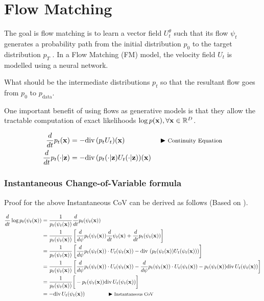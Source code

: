 \documentclass[a4paper, 11pt]{article}
\begin{document}
\section{Flow Matching}
The goal is flow matching is to learn a vector field $U_t^{\theta}$ such that its flow $\psi_t$ generates a probability path from the initial distribution $p_0$ to the target distribution $p_T$ \citep{lipman2024flow}. In a Flow Matching (FM) model, the velocity field $U_t$ is modelled using a neural network.

What should be the intermediate distributions $p_t$ so that the resultant flow goes from $p_0$ to $p_{\text{data}}$.

\begin{Takeaway}{}{}
    One important benefit of using flows as generative models is that they allow the tractable computation of exact likelihoods $\log p(\mbox{$\mbox{$\mathbf{x}$}$}), \forall \mbox{$\mbox{$\mathbf{x}$}$} \in \mathbb{R}^D$.
\end{Takeaway}


\begin{align}
    \frac{d}{dt} p_t(\mbox{$\mbox{$\mathbf{x}$}$}) &= - \text{div}\, (p_t U_t)(\mbox{$\mbox{$\mathbf{x}$}$}) && \blacktriangleright\text{\footnotesize Continuity Equation} \label{eq:contin-eq}\\ 
    \frac{d}{dt} p_t(\cdot | \mbox{$\mbox{$\mathbf{z}$}$}) &= - \text{div}\, (p_t(\cdot |\mbox{$\mbox{$\mathbf{z}$}$}) U_t(\cdot |\mbox{$\mbox{$\mathbf{z}$}$}))(\mbox{$\mbox{$\mathbf{x}$}$})
\end{align}
 

\subsubsection{Instantaneous Change-of-Variable formula}

Proof for the above Instantaneous CoV can be derived as follows (Based on \cite{mathieu2020riemannian}).

\begin{align}
    \frac{d}{dt} \log p_t(\psi_t(\mbox{$\mbox{$\mathbf{x}$}$})) &=  \frac{1}{p_t(\psi_t(\mbox{$\mbox{$\mathbf{x}$}$}))}\frac{d}{dt}p_t(\psi_t(\mbox{$\mbox{$\mathbf{x}$}$})) \\
    &=  \frac{1}{p_t(\psi_t(\mbox{$\mbox{$\mathbf{x}$}$}))}\left [\frac{d}{d\psi}p_t(\psi_t(\mbox{$\mbox{$\mathbf{x}$}$})) \frac{d}{dt}\psi_t(\mbox{$\mbox{$\mathbf{x}$}$}) + \frac{d}{dt}p_t(\psi_t(\mbox{$\mbox{$\mathbf{x}$}$})) \right ]\\
    &= \frac{1}{p_t(\psi_t(\mbox{$\mbox{$\mathbf{x}$}$}))} \left [\frac{d}{d\psi}p_t(\psi_t(\mbox{$\mbox{$\mathbf{x}$}$})) \cdot U_t(\psi_t(\mbox{$\mbox{$\mathbf{x}$}$})) - \text{div}\, \left (p_t(\psi_t(\mbox{$\mbox{$\mathbf{x}$}$})) U_t(\psi_t(\mbox{$\mbox{$\mathbf{x}$}$})) \right ) \right ] \\
    &= \frac{1}{p_t(\psi_t(\mbox{$\mbox{$\mathbf{x}$}$}))} \left [\frac{d}{d\psi}p_t(\psi_t(\mbox{$\mbox{$\mathbf{x}$}$})) \cdot U_t(\psi_t(\mbox{$\mbox{$\mathbf{x}$}$})) - \frac{d}{d\psi}p_t(\psi_t(\mbox{$\mbox{$\mathbf{x}$}$})) \cdot U_t(\psi_t(\mbox{$\mbox{$\mathbf{x}$}$})) - p_t(\psi_t(\mbox{$\mbox{$\mathbf{x}$}$})) \text{div}\, U_t(\psi_t(\mbox{$\mbox{$\mathbf{x}$}$}))  \right ] \\
    &= \frac{1}{p_t(\psi_t(\mbox{$\mbox{$\mathbf{x}$}$}))} \bigg [- p_t(\psi_t(\mbox{$\mbox{$\mathbf{x}$}$})) \text{div}\, U_t(\psi_t(\mbox{$\mbox{$\mathbf{x}$}$}))  \bigg ] \\
    &= - \text{div}\, U_t(\psi_t(\mbox{$\mbox{$\mathbf{x}$}$})) \qquad \qquad \blacktriangleright\text{\footnotesize Instantaneous CoV} \label{eq:instant-cov}
\end{align}
\end{document}
